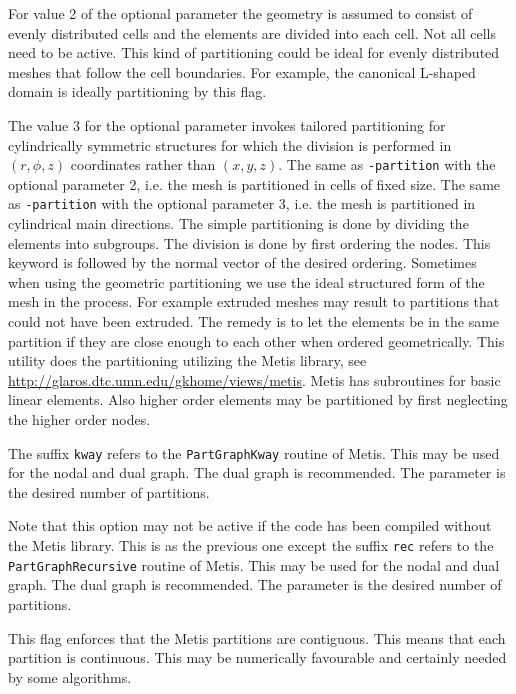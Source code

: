 For value 2 of the optional parameter the geometry is assumed to consist of evenly distributed cells and the elements 
are divided into each cell. Not all cells need to be active. This kind of partitioning could be ideal for evenly distributed meshes
that follow the cell boundaries. For example, the canonical L-shaped domain is ideally partitioning by this flag.

The value 3 for the optional parameter invokes tailored partitioning for cylindrically symmetric structures for which the division is performed 
in $(r,\phi,z)$ coordinates rather than $(x,y,z)$. 
%
The same as \texttt{-partition} with the optional parameter 2, i.e. the
mesh is partitioned in cells of fixed size.
%
The same as \texttt{-partition} with the optional parameter 3, i.e. the
mesh is partitioned in cylindrical main directions.
%
The simple partitioning is done by dividing the elements
into subgroups. The division is done by first ordering the nodes. This
keyword is followed by the normal vector of the desired ordering.
%
Sometimes when using the geometric partitioning we use the ideal
structured form of the mesh in the process. For example extruded meshes
may result to partitions that could not have been extruded. The remedy
is to let the elements be in the same partition if they are close enough
to each other when ordered geometrically.
%
This utility does the partitioning utilizing the Metis library, see
\url{http://glaros.dtc.umn.edu/gkhome/views/metis}. Metis has subroutines
for basic linear elements. Also higher order elements may be partitioned
by first neglecting the higher order nodes.

The suffix \texttt{kway} refers to the \texttt{PartGraphKway} routine of Metis. 
This may be used for the nodal and dual graph. The dual graph is recommended. 
The parameter is the desired number of partitions. 

Note that this option may not be active if the code has been compiled
without the Metis library.
%
This is as the previous one except the suffix \texttt{rec} refers to the \texttt{PartGraphRecursive} routine of Metis. 
This may be used for the nodal and dual graph. The dual graph is recommended. 
The parameter is the desired number of partitions. 

This flag enforces that the Metis partitions are contiguous. This means that
each partition is continuous. This may be numerically favourable and
certainly needed by some algorithms. 

